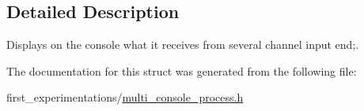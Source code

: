 \subsection{Detailed Description}
Displays on the console what it receives from several channel input end;. 

The documentation for this struct was generated from the following file\-:\begin{DoxyCompactItemize}
\item 
first\-\_\-experimentations/\hyperlink{multi__console__process_8h}{multi\-\_\-console\-\_\-process.\-h}\end{DoxyCompactItemize}
